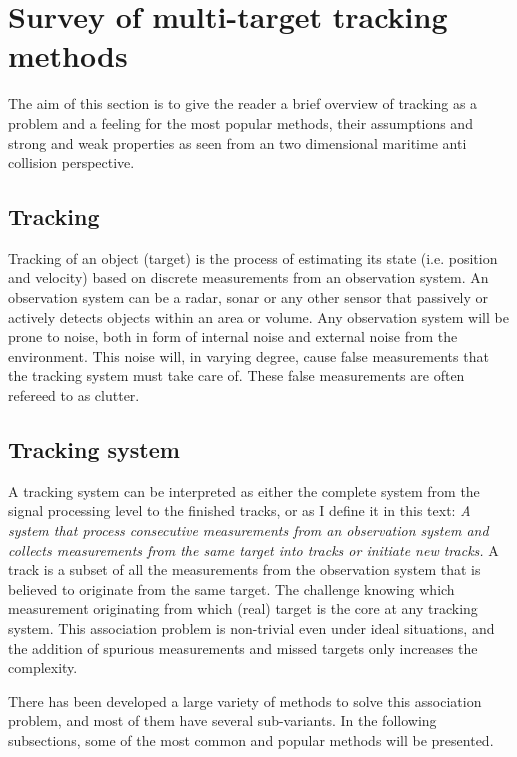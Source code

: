 
\section{Survey of multi-target tracking methods}
\label{sec:survey}
The aim of this section is to give the reader a brief overview of tracking as a problem and a feeling for the most popular methods, their assumptions and strong and weak properties as seen from an two dimensional maritime anti collision perspective.

\subsection{Tracking}
Tracking of an object (\gls{target}) is the process of estimating its state (i.e. position and velocity) based on discrete \glspl{measurement} from an observation system. An observation system can be a \gls{radar}, sonar or any other sensor that passively or actively detects objects within an area or volume. Any observation system will be prone to noise, both in form of internal noise and external noise from the environment. This noise will, in varying degree, cause false \glspl{measurement} that the tracking system must take care of. These false \glspl{measurement} are often refereed to as \gls{clutter}. 

\subsection{Tracking system}
A tracking system can be interpreted as either the complete system from the signal processing level to the finished tracks, or as I define it in this text: \emph{A system that process consecutive \glspl{measurement} from an observation system and collects \glspl{measurement} from the same \gls{target} into tracks or initiate new tracks.} A track is a subset of all the \glspl{measurement} from the observation system that is believed to originate from the same \gls{target}. The challenge knowing which \gls{measurement} originating from which (real) \gls{target} is the core at any tracking system. This association problem is non-trivial even under ideal situations, and the addition of spurious \glspl{measurement} and missed \glspl{target} only increases the complexity.

There has been developed a large variety of methods to solve this association problem, and most of them have several sub-variants. In the following subsections, some of the most common and popular methods will be presented.

